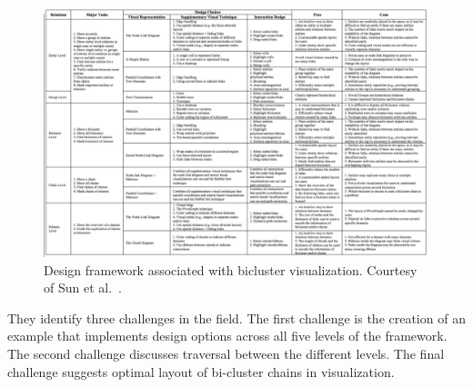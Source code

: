 \begin{figure}[t]
\begin{center}
\includegraphics[width=1\textwidth]{images/sun2014five.png}
\caption{Design framework associated with bicluster visualization. Courtesy of Sun et al.\ \cite{sun2014five}.} \label{fig: sun2014five}
\end{center}
\end{figure}



They identify three challenges in the field. The first challenge is the creation of an example  that implements design options across all five levels of the framework. The second challenge discusses traversal between the different levels. The final challenge suggests optimal layout of bi-cluster chains in visualization.

